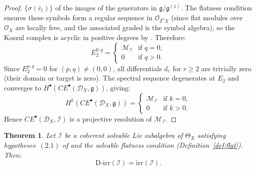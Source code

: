 \documentclass[12pt,a4paper]{article}
\newtheorem{theorem}{Theorem}[section]
\begin{document}
\begin{proof}
$\{\sigma(\bar{v}_i)\}$ of the images of the generators in
$\mathfrak{g}/\mathfrak{g}^{(1)}$. The flatness condition ensures
these symbols form a regular sequence in $\mathcal{O}_{T^*X}$
(since flat modules over $\mathcal{O}_X$ are locally free, and the
associated graded is the symbol algebra), so the Koszul complex
is acyclic in positive degrees by \cite[Prop.~3.3]{D16}. Therefore:
\[
E_2^{0,q} =
\begin{cases}
\mathcal{M}_{\mathcal{I}} & \text{if } q = 0, \\
0 & \text{if } q > 0.
\end{cases}
\]
Since $E_2^{p,q} = 0$ for $(p,q) \neq (0,0)$, all differentials
$d_r$ for $r \geq 2$ are trivially zero (their domain or target
is zero). The spectral sequence degenerates at $E_2$ and converges to
$H^\bullet(CE^\bullet(\mathcal{D}_X, \mathfrak{g}))$, giving:
\[
H^k(CE^\bullet(\mathcal{D}_X, \mathfrak{g})) =
\begin{cases}
\mathcal{M}_{\mathcal{I}} & \text{if } k = 0, \\
0 & \text{if } k > 0.
\end{cases}
\]
Hence $CE^\bullet(\mathcal{D}_X, \mathcal{I})$ is a projective resolution
of $\mathcal{M}_{\mathcal{I}}$.
\end{proof}

\begin{theorem}\label{thm:weakening}
Let $\mathcal{I}$ be a coherent solvable Lie subalgebra of $\Theta_X$
satisfying hypotheses~$(2.1)$ of \cite{D16} and the solvable flatness
condition (Definition~\ref{def:flat}). Then:
\[
\mathrm{D\text{-}irr}(\mathcal{I}) = \mathrm{irr}(\mathcal{I}).
\]
\end{theorem}
\end{document}
